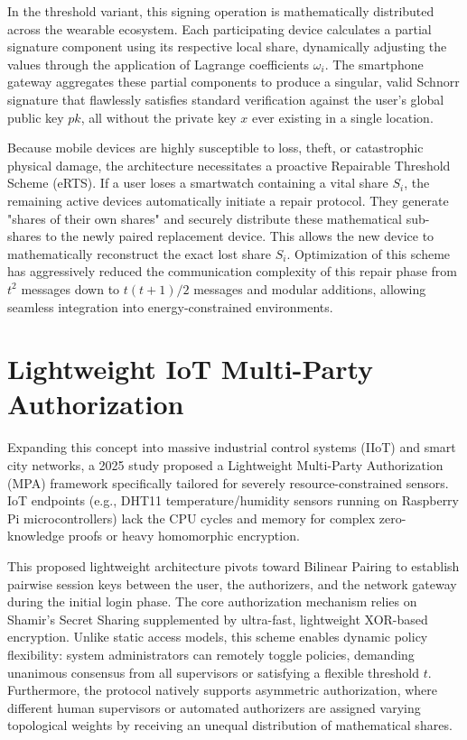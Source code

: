 \documentclass[11pt, a4paper]{article}
\begin{document}
In the threshold variant, this signing operation is mathematically distributed across the wearable ecosystem. Each participating device calculates a partial signature component using its respective local share, dynamically adjusting the values through the application of Lagrange coefficients $\omega_i$. The smartphone gateway aggregates these partial components to produce a singular, valid Schnorr signature that flawlessly satisfies standard verification against the user's global public key $pk$, all without the private key $x$ ever existing in a single location.

Because mobile devices are highly susceptible to loss, theft, or catastrophic physical damage, the architecture necessitates a proactive Repairable Threshold Scheme (eRTS). If a user loses a smartwatch containing a vital share $S_i$, the remaining active devices automatically initiate a repair protocol. They generate "shares of their own shares" and securely distribute these mathematical sub-shares to the newly paired replacement device. This allows the new device to mathematically reconstruct the exact lost share $S_i$. Optimization of this scheme has aggressively reduced the communication complexity of this repair phase from $t^2$ messages down to $t(t+1)/2$ messages and modular additions, allowing seamless integration into energy-constrained environments.

\section*{Lightweight IoT Multi-Party Authorization}
Expanding this concept into massive industrial control systems (IIoT) and smart city networks, a 2025 study proposed a Lightweight Multi-Party Authorization (MPA) framework specifically tailored for severely resource-constrained sensors. IoT endpoints (e.g., DHT11 temperature/humidity sensors running on Raspberry Pi microcontrollers) lack the CPU cycles and memory for complex zero-knowledge proofs or heavy homomorphic encryption.

This proposed lightweight architecture pivots toward Bilinear Pairing to establish pairwise session keys between the user, the authorizers, and the network gateway during the initial login phase. The core authorization mechanism relies on Shamir’s Secret Sharing supplemented by ultra-fast, lightweight XOR-based encryption. Unlike static access models, this scheme enables dynamic policy flexibility: system administrators can remotely toggle policies, demanding unanimous consensus from all supervisors or satisfying a flexible threshold $t$. Furthermore, the protocol natively supports asymmetric authorization, where different human supervisors or automated authorizers are assigned varying topological weights by receiving an unequal distribution of mathematical shares.
\end{document}
